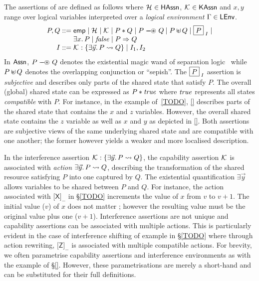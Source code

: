 \begin{definition}\label{def:assertions}
The assertions of \colosl are defined as follows where $\mathcal{H}_{} \in \textsf{HAssn}$, $\mathcal{K}_{} \in \textsf{KAssn}$ and $x, y$ range over logical variables interpreted over a \emph{logical environment} $\Gamma \in \textsf{LEnv}$.
%
\[
\begin{array}{r@{}l}
	P, Q  ::=\null& \emp \mid \heapAss{} \mid \capAss{} \mid P * Q \mid P \ewand Q \:|\; P \sepish Q \mid \shared{P}{I} \mid \\
	& \exsts{x} P \mid \m{false} \mid P \Rightarrow Q \\
	I ::=\null& \interAss{\capAss{}}{\vec{y}}{P}{Q} \mid I_1,I_2
\end{array}
\]
%
In $\textsf{Assn}$, $P \mathrel{\mbox{$\hspace*{-0.03em}\mathord{-}\hspace*{-0.66em} \mathord{-}\hspace*{-0.14em}\mathord{\circledast}$\hspace*{0.05em}}} Q$ denotes the existential magic wand of separation logic~\cite{TODO} while $P \sepish Q$ denotes the overlapping conjunction or ``sepish''. The $\boxed{P}_{\; I}$ assertion is \emph{subjective} and describes only parts of the shared state that satisfy $P$. The overall (global) shared state can be expressed as $P * \mathit{true}$ where $\mathit{true}$ represents all states \emph{compatible} with $P$. For instance, in the example of~\ref{TODO}, \fig\ref{} describes parts of the shared state that contains the $x$ and $z$ variables. However, the overall shared state contains the $z$ variable as well as $x$ and $y$ as depicted in \fig\ref{}. Both assertions are subjective views of the same underlying shared state and are compatible with one another; the former however yields a weaker and more localised description.

In the interference assertion $\mathcal{K}_{}: \left\{ \exists \vec{y}.\, P \rightsquigarrow Q \right\} $, the capability assertion $\mathcal{K}_{}$ is associated with \emph{action} $\exists \vec{y}.\, P \rightsquigarrow Q$, describing the transformation of the shared resource satisfying $P$ into one captured by $Q$. The existential quantification $\exists \vec{y}$ allows variables to be shared between $P$ and $Q$. For instance, the action associated with $\textsf{[X]}_{-}$ in \S\ref{TODO} increments the value of $x$ from $v$ to $v+1$. The initial value ($v$) of $x$ does not matter ; however the resulting value must be the original value plus one ($v+1$). Interference assertions are not unique and capability assertions can be associated with multiple actions. This is particularly evident in the case of interference shifting of example in \S\ref{TODO} where through action rewriting, $\textsf{[Z]}_{-}$ is associated with multiple compatible actions. For brevity, we often parametrise capability assertions and interference environments as with the example of \S\ref{}. However, these parametrisations are merely a short-hand and can be substituted for their full definitions. 
\end{definition}
%
%
